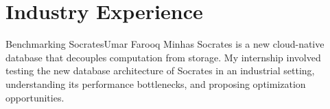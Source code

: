 \documentclass[10pt]{article} %
\begin{document}
\section{Industry Experience}
{Benchmarking Socrates}{Umar Farooq Minhas}
{Socrates is a new cloud-native database that decouples computation from storage. 
My internship involved testing the new database architecture of Socrates 
in an industrial setting, understanding its performance bottlenecks, 
and proposing optimization opportunities.}

\vspace{-5mm}

\begin{comment}
\section{Recent Research Projects (Detailed Descriptions)}

\projectWithNum{Data Shift Explaination}{Sep. 2021-Present}
{ShiftXplain is a framework for explaining data shift. 
Data shift is ubiquitous in real-world datasets 
due to the natural evolution in the underlying data 
relationships and patterns, often leading to a degradation 
of the performance of data-dependent applications (e.g., an ML model). 
ShiftXplain explains the data shift 
between two datasets using a conjunction of predicates 
and proposes a novel metric, shiftIndex, to capture 
both general and unique shift patterns. 
More importantly, shiftIndex is partially monotonic and bounded, 
which is leveraged by our search algorithm to efficiently 
prune the search space without sacrificing the explanation quality.}
 
\vspace{3mm}


\end{comment}
\end{document}
